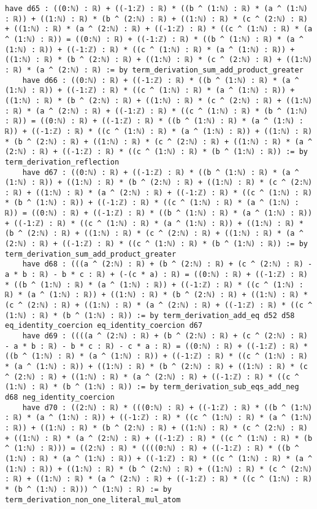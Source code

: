 \documentclass{article}
\begin{document}
\begin{tcolorbox}[colback=white!10, width=\linewidth]
\begin{lstlisting}[language=Lean4]
    have d65 : ((0:ℕ) : ℝ) + ((-1:ℤ) : ℝ) * ((b ^ (1:ℕ) : ℝ) * (a ^ (1:ℕ) : ℝ)) + ((1:ℕ) : ℝ) * (b ^ (2:ℕ) : ℝ) + ((1:ℕ) : ℝ) * (c ^ (2:ℕ) : ℝ) + ((1:ℕ) : ℝ) * (a ^ (2:ℕ) : ℝ) + ((-1:ℤ) : ℝ) * ((c ^ (1:ℕ) : ℝ) * (a ^ (1:ℕ) : ℝ)) = ((0:ℕ) : ℝ) + ((-1:ℤ) : ℝ) * ((b ^ (1:ℕ) : ℝ) * (a ^ (1:ℕ) : ℝ)) + ((-1:ℤ) : ℝ) * ((c ^ (1:ℕ) : ℝ) * (a ^ (1:ℕ) : ℝ)) + ((1:ℕ) : ℝ) * (b ^ (2:ℕ) : ℝ) + ((1:ℕ) : ℝ) * (c ^ (2:ℕ) : ℝ) + ((1:ℕ) : ℝ) * (a ^ (2:ℕ) : ℝ) := by term_derivation_sum_add_product_greater
    have d66 : ((0:ℕ) : ℝ) + ((-1:ℤ) : ℝ) * ((b ^ (1:ℕ) : ℝ) * (a ^ (1:ℕ) : ℝ)) + ((-1:ℤ) : ℝ) * ((c ^ (1:ℕ) : ℝ) * (a ^ (1:ℕ) : ℝ)) + ((1:ℕ) : ℝ) * (b ^ (2:ℕ) : ℝ) + ((1:ℕ) : ℝ) * (c ^ (2:ℕ) : ℝ) + ((1:ℕ) : ℝ) * (a ^ (2:ℕ) : ℝ) + ((-1:ℤ) : ℝ) * ((c ^ (1:ℕ) : ℝ) * (b ^ (1:ℕ) : ℝ)) = ((0:ℕ) : ℝ) + ((-1:ℤ) : ℝ) * ((b ^ (1:ℕ) : ℝ) * (a ^ (1:ℕ) : ℝ)) + ((-1:ℤ) : ℝ) * ((c ^ (1:ℕ) : ℝ) * (a ^ (1:ℕ) : ℝ)) + ((1:ℕ) : ℝ) * (b ^ (2:ℕ) : ℝ) + ((1:ℕ) : ℝ) * (c ^ (2:ℕ) : ℝ) + ((1:ℕ) : ℝ) * (a ^ (2:ℕ) : ℝ) + ((-1:ℤ) : ℝ) * ((c ^ (1:ℕ) : ℝ) * (b ^ (1:ℕ) : ℝ)) := by term_derivation_reflection
    have d67 : ((0:ℕ) : ℝ) + ((-1:ℤ) : ℝ) * ((b ^ (1:ℕ) : ℝ) * (a ^ (1:ℕ) : ℝ)) + ((1:ℕ) : ℝ) * (b ^ (2:ℕ) : ℝ) + ((1:ℕ) : ℝ) * (c ^ (2:ℕ) : ℝ) + ((1:ℕ) : ℝ) * (a ^ (2:ℕ) : ℝ) + ((-1:ℤ) : ℝ) * ((c ^ (1:ℕ) : ℝ) * (b ^ (1:ℕ) : ℝ)) + ((-1:ℤ) : ℝ) * ((c ^ (1:ℕ) : ℝ) * (a ^ (1:ℕ) : ℝ)) = ((0:ℕ) : ℝ) + ((-1:ℤ) : ℝ) * ((b ^ (1:ℕ) : ℝ) * (a ^ (1:ℕ) : ℝ)) + ((-1:ℤ) : ℝ) * ((c ^ (1:ℕ) : ℝ) * (a ^ (1:ℕ) : ℝ)) + ((1:ℕ) : ℝ) * (b ^ (2:ℕ) : ℝ) + ((1:ℕ) : ℝ) * (c ^ (2:ℕ) : ℝ) + ((1:ℕ) : ℝ) * (a ^ (2:ℕ) : ℝ) + ((-1:ℤ) : ℝ) * ((c ^ (1:ℕ) : ℝ) * (b ^ (1:ℕ) : ℝ)) := by term_derivation_sum_add_product_greater
    have d68 : (((a ^ (2:ℕ) : ℝ) + (b ^ (2:ℕ) : ℝ) + (c ^ (2:ℕ) : ℝ) - a * b : ℝ) - b * c : ℝ) + (-(c * a) : ℝ) = ((0:ℕ) : ℝ) + ((-1:ℤ) : ℝ) * ((b ^ (1:ℕ) : ℝ) * (a ^ (1:ℕ) : ℝ)) + ((-1:ℤ) : ℝ) * ((c ^ (1:ℕ) : ℝ) * (a ^ (1:ℕ) : ℝ)) + ((1:ℕ) : ℝ) * (b ^ (2:ℕ) : ℝ) + ((1:ℕ) : ℝ) * (c ^ (2:ℕ) : ℝ) + ((1:ℕ) : ℝ) * (a ^ (2:ℕ) : ℝ) + ((-1:ℤ) : ℝ) * ((c ^ (1:ℕ) : ℝ) * (b ^ (1:ℕ) : ℝ)) := by term_derivation_add_eq d52 d58 eq_identity_coercion eq_identity_coercion d67
    have d69 : ((((a ^ (2:ℕ) : ℝ) + (b ^ (2:ℕ) : ℝ) + (c ^ (2:ℕ) : ℝ) - a * b : ℝ) - b * c : ℝ) - c * a : ℝ) = ((0:ℕ) : ℝ) + ((-1:ℤ) : ℝ) * ((b ^ (1:ℕ) : ℝ) * (a ^ (1:ℕ) : ℝ)) + ((-1:ℤ) : ℝ) * ((c ^ (1:ℕ) : ℝ) * (a ^ (1:ℕ) : ℝ)) + ((1:ℕ) : ℝ) * (b ^ (2:ℕ) : ℝ) + ((1:ℕ) : ℝ) * (c ^ (2:ℕ) : ℝ) + ((1:ℕ) : ℝ) * (a ^ (2:ℕ) : ℝ) + ((-1:ℤ) : ℝ) * ((c ^ (1:ℕ) : ℝ) * (b ^ (1:ℕ) : ℝ)) := by term_derivation_sub_eqs_add_neg d68 neg_identity_coercion
    have d70 : ((2:ℕ) : ℝ) * (((0:ℕ) : ℝ) + ((-1:ℤ) : ℝ) * ((b ^ (1:ℕ) : ℝ) * (a ^ (1:ℕ) : ℝ)) + ((-1:ℤ) : ℝ) * ((c ^ (1:ℕ) : ℝ) * (a ^ (1:ℕ) : ℝ)) + ((1:ℕ) : ℝ) * (b ^ (2:ℕ) : ℝ) + ((1:ℕ) : ℝ) * (c ^ (2:ℕ) : ℝ) + ((1:ℕ) : ℝ) * (a ^ (2:ℕ) : ℝ) + ((-1:ℤ) : ℝ) * ((c ^ (1:ℕ) : ℝ) * (b ^ (1:ℕ) : ℝ))) = ((2:ℕ) : ℝ) * ((((0:ℕ) : ℝ) + ((-1:ℤ) : ℝ) * ((b ^ (1:ℕ) : ℝ) * (a ^ (1:ℕ) : ℝ)) + ((-1:ℤ) : ℝ) * ((c ^ (1:ℕ) : ℝ) * (a ^ (1:ℕ) : ℝ)) + ((1:ℕ) : ℝ) * (b ^ (2:ℕ) : ℝ) + ((1:ℕ) : ℝ) * (c ^ (2:ℕ) : ℝ) + ((1:ℕ) : ℝ) * (a ^ (2:ℕ) : ℝ) + ((-1:ℤ) : ℝ) * ((c ^ (1:ℕ) : ℝ) * (b ^ (1:ℕ) : ℝ))) ^ (1:ℕ) : ℝ) := by term_derivation_non_one_literal_mul_atom

\end{lstlisting}
\end{tcolorbox}
\end{document}
